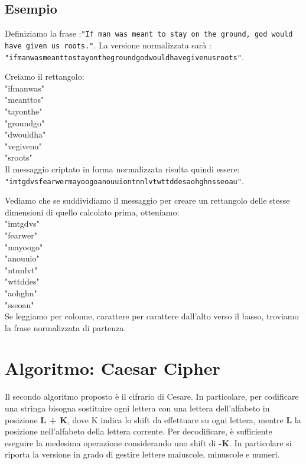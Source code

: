 \subsection{Esempio}
Definiziamo la frase :\texttt{"If man was meant to stay on the ground, god would have given us roots."}.
La versione normalizzata sarà : \texttt{"ifmanwasmeanttostayonthegroundgodwouldhavegivenusroots"}.

Creiamo il rettangolo: \\

\noindent"ifmanwas" \\
"meanttos" \\
"tayonthe" \\ 
"groundgo" \\
"dwouldha" \\
"vegivenu" \\
"sroots\;\;\;\;" \\

Il messaggio criptato in forma normalizzata risulta quindi essere: \\
\texttt{"imtgdvsfearwermayoogoanouuiontnnlvtwttddesaohghnsseoau"}. 

Vediamo che se suddividiamo il messaggio per creare un rettangolo delle stesse dimensioni di quello calcolato prima, otteniamo: \\

\noindent"imtgdvs" \\
"fearwer" \\
"mayoogo" \\
"anouuio" \\
"ntnnlvt" \\
"wttddes" \\
"aohghn\;\;" \\
"sseoau\;\;" \\

Se leggiamo per colonne, carattere per carattere dall'alto verso il basso, troviamo la frase normalizzata di partenza.

\section{Algoritmo: Caesar Cipher}
Il secondo algoritmo proposto è il cifrario di Cesare. In particolare, per codificare una stringa bisogna sostituire ogni lettera con una lettera dell'alfabeto in posizione \textbf{L + K}, dove K indica lo shift da effettuare su ogni lettera, mentre \textbf{L} la posizione nell'alfabeto della lettera corrente. Per decodificare, è sufficiente eseguire la medesima operazione considerando uno shift di \textbf{-K}. In particolare si riporta la versione in grado di gestire lettere maiuscole, minuscole e numeri. 

